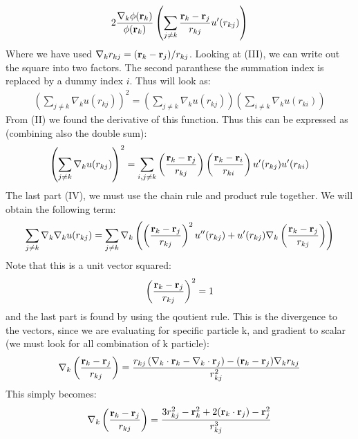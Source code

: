 \documentclass[a4paper, 10pt]{article}
\begin{document}
\begin{appendices}
\begin{align*}
2\frac{\nabla_{k}\phi(\bold{r}_{k})}{\phi{(\bold{r}_{k})}}\left(\sum_{j\neq k}\frac{\bold{r}_{k} - \bold{r}_{j}}{r_{kj}}u'(r_{kj})\right)
\end{align*}
Where we have used $\nabla_{k} r_{kj} = (\bold{r}_{k} - \bold{r}_{j})/r_{kj}$.
Looking at (III), we can write out the square into two factors. The second paranthese the summation index is replaced by a
dummy index $i$. Thus will look as:
\begin{align}
  \left(\sum_{j\neq k}\nabla_{k} u(r_{kj})\right)^2 = \left(\sum_{j\neq k}\nabla_{k} u(r_{kj})\right)\left(\sum_{i\neq k}\nabla_{k} u(r_{ki})\right)
\end{align}
From (II) we found the derivative of this function. Thus this can be expressed as (combining also the double sum):
\begin{align}
  \left(\sum_{j\neq k}\nabla_{k} u(r_{kj})\right)^2 =
  \sum_{i, j\neq k}\left(\frac{\bold{r}_{k} - \bold{r}_{j}}{r_{kj}}\right)
  \left(\frac{\bold{r}_{k} - \bold{r}_{i}}{r_{ki}}\right)u'(r_{kj})u'(r_{ki})
\end{align}
The last part (IV), we must use the chain rule and product rule together. We will obtain
the following term:
\begin{align}
  \sum_{j \neq k}\nabla_{k}\nabla_{k}u(r_{kj}) =
  \sum_{j \neq k}\nabla_{k}\left(
  \left(\frac{\bold{r}_{k} - \bold{r}_{j}}{r_{kj}}\right)^2 u''(r_{kj}) + u'(r_{kj})\nabla_{k}
  \left(\frac{\bold{r}_{k} - \bold{r}_{j}}{r_{kj}}\right)\right)
\end{align}
Note that this is a unit vector squared:
\begin{align}
  \left(\frac{\bold{r}_{k} - \bold{r}_{j}}{r_{kj}}\right)^2 = 1
\end{align}
and the last part is found by using the qoutient rule. This is the divergence to the vectors, since we are evaluating for
specific particle k, and gradient to scalar (we must look for all combination of k particle):
\begin{align}
  \nabla_{k}
  \left(\frac{\bold{r}_{k} - \bold{r}_{j}}{r_{kj}}\right)
  = \frac{r_{kj}\left(\nabla_{k}\cdot\bold{r}_{k}-
  \nabla_{k}\cdot\bold{r}_{j}\right) -
  (\bold{r}_{k}-\bold{r}_{j})\nabla_{k}r_{kj}}{r_{kj}^2}
\end{align}
This simply becomes:
\begin{align}
  \nabla_{k}
  \left(\frac{\bold{r}_{k} - \bold{r}_{j}}{r_{kj}}\right)
  = \frac{3r_{kj}^2 - \bold{r}^2_{k} + 2(\bold{r}_{k}\cdot \bold{r}_{j}) - \bold{r}^2_{j}}{r_{kj}^3}
\end{align}

\end{appendices}
\end{document}
